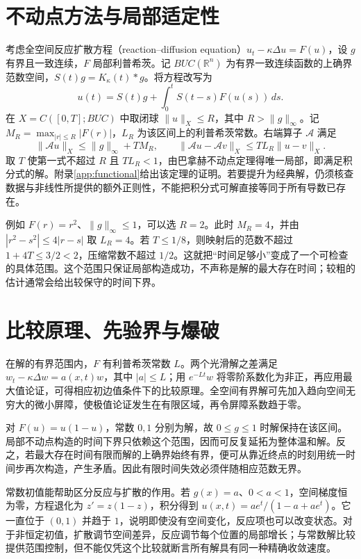 \documentclass[UTF8,12pt,a4paper,fontset=fandol]{ctexbook}
\begin{document}
\section{不动点方法与局部适定性}
考虑全空间反应扩散方程（reaction--diffusion equation）$u_t-\kappa\Delta u=F(u)$，设 $g$ 有界且一致连续，$F$ 局部利普希茨。记 $BUC(\mathbb R^n)$ 为有界一致连续函数的上确界范数空间，$S(t)g=K_\kappa(t)*g$。将方程改写为
\begin{equation}
 u(t)=S(t)g+\int_0^tS(t-s)F(u(s))\,ds.
 \label{eq:semilinear-mild}
\end{equation}
在 $X=C([0,T];BUC)$ 中取闭球 $\|u\|_X\le R$，其中 $R>\|g\|_\infty$。记 $M_R=\max_{|r|\le R}|F(r)|$，$L_R$ 为该区间上的利普希茨常数。右端算子 $\mathcal A$ 满足
\[
 \|\mathcal Au\|_X\le\|g\|_\infty+TM_R,\qquad
 \|\mathcal Au-\mathcal Av\|_X\le TL_R\|u-v\|_X.
\]
取 $T$ 使第一式不超过 $R$ 且 $TL_R<1$，由巴拿赫不动点定理得唯一局部，即满足积分式的解。附录\ref{app:functional}给出该定理的证明。若要提升为经典解，仍须核查数据与非线性所提供的额外正则性，不能把积分式可解直接等同于所有导数已存在。

例如 $F(r)=r^2$、$\|g\|_\infty\le1$，可以选 $R=2$。此时 $M_R=4$，并由 $|r^2-s^2|\le4|r-s|$ 取 $L_R=4$。若 $T\le1/8$，则映射后的范数不超过 $1+4T\le3/2<2$，压缩常数不超过 $1/2$。这就把“时间足够小”变成了一个可检查的具体范围。这个范围只保证局部构造成功，不声称是解的最大存在时间；较粗的估计通常会给出较保守的时间下界。

\section{比较原理、先验界与爆破}
在解的有界范围内，$F$ 有利普希茨常数 $L$。两个光滑解之差满足 $w_t-\kappa\Delta w=a(x,t)w$，其中 $|a|\le L$；用 $e^{-Lt}w$ 将零阶系数化为非正，再应用最大值论证，可得相应初边值条件下的比较原理。全空间有界解可先加入趋向空间无穷大的微小屏障，使极值论证发生在有限区域，再令屏障系数趋于零。

对 $F(u)=u(1-u)$，常数 $0,1$ 分别为解，故 $0\le g\le1$ 时解保持在该区间。局部不动点构造的时间下界只依赖这个范围，因而可反复延拓为整体温和解。反之，若最大存在时间有限而解的上确界始终有界，便可从靠近终点的时刻用统一时间步再次构造，产生矛盾。因此有限时间失效必须伴随相应范数无界。

常数初值能帮助区分反应与扩散的作用。若 $g(x)=a$、$0<a<1$，空间梯度恒为零，方程退化为 $z'=z(1-z)$，积分得到 $u(x,t)=a e^t/(1-a+a e^t)$。它一直位于 $(0,1)$ 并趋于 $1$，说明即使没有空间变化，反应项也可以改变状态。对于非恒定初值，扩散调节空间差异，反应调节每个位置的局部增长；与常数解比较提供范围控制，但不能仅凭这个比较就断言所有解具有同一种精确收敛速度。
\end{document}

